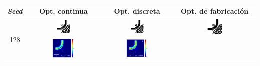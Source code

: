 \begin{table}[ht]
    \centering
    \vspace*{-2.5cm}
    \hspace*{-3cm}
    \begin{tabular}{|c|c|c|c|}
    \hline 
    \emph{Seed} & Opt. continua & Opt. discreta &  Opt. de fabricación \\
    \hline
      \multirow{2}{*}{128} &
      \includegraphics[width=0.20\textwidth]{image/results/bend/L-BFGS-B/visualize_eps_cont_128.png} &
      \includegraphics[width=0.20\textwidth]{image/results/bend/L-BFGS-B/visualize_eps_disc_128.png} &
      \includegraphics[width=0.20\textwidth]{image/results/bend/L-BFGS-B/visualize_eps_fab_128.png} \\
      \cline{2-4}
      &
      \includegraphics[width=0.33\textwidth]{image/results/bend/L-BFGS-B/visualize_field_cont_128.png} &
      \includegraphics[width=0.33\textwidth]{image/results/bend/L-BFGS-B/visualize_field_disc_128.png} &

\end{tabular}
\end{table}
